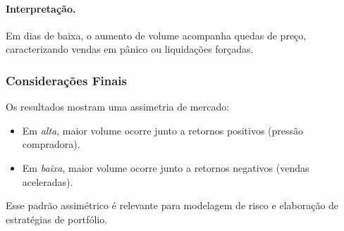 \paragraph{Interpretação.}
Em dias de baixa, o aumento de volume acompanha quedas de preço, caracterizando vendas em pânico ou liquidações forçadas.

\subsubsection{Considerações Finais}
Os resultados mostram uma assimetria de mercado:
\begin{itemize}
  \item Em \emph{alta}, maior volume ocorre junto a retornos positivos (pressão compradora).
  \item Em \emph{baixa}, maior volume ocorre junto a retornos negativos (vendas aceleradas).
\end{itemize}
Esse padrão assimétrico é relevante para modelagem de risco e elaboração de estratégias de portfólio.
